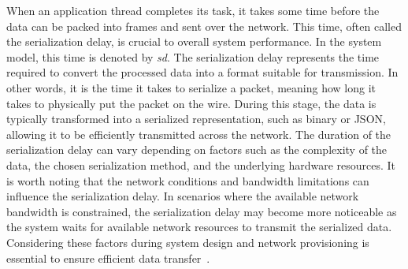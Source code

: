     When an application thread completes its task, it takes some time before the data can be packed into frames and sent over the network. This time, often called the serialization delay, is crucial to overall system performance. In the system model, this time is denoted by \textit{sd}. 
    The serialization delay represents the time required to convert the processed data into a format suitable for transmission. In other words, it is the time it takes to serialize a packet, meaning how long it takes to physically put the packet on the wire. 
    During this stage, the data is typically transformed into a serialized representation, such as binary or JSON, allowing it to be efficiently transmitted across the network. The duration of the serialization delay can vary depending on factors such as the complexity of the data, the chosen serialization method, and the underlying hardware resources.
    It is worth noting that the network conditions and bandwidth limitations can influence the serialization delay. In scenarios where the available network bandwidth is constrained, the serialization delay may become more noticeable as the system waits for available network resources to transmit the serialized data. Considering these factors during system design and network provisioning is essential to ensure efficient data transfer~\cite{askaripoor2023designer}.



